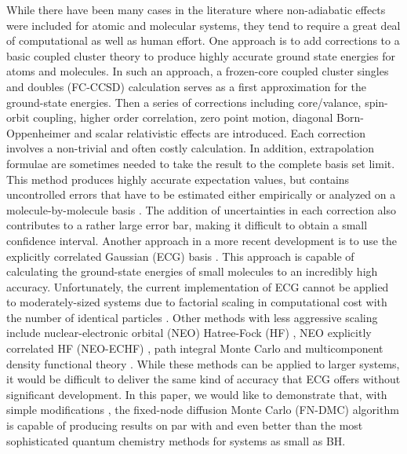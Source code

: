 \documentclass[aps,prl,superscriptaddress,groupedaddress]{revtex4}
\begin{document}
While there have been many cases in the literature where non-adiabatic effects were included for atomic and molecular systems, they tend to require a great deal of computational as well as human effort. One approach is to add corrections to a basic coupled cluster theory to produce highly accurate ground state energies for atoms and molecules\cite{Feller_Corrections}. In such an approach, a frozen-core coupled cluster singles and doubles (FC-CCSD) \cite{Purvis_CCSD} calculation serves as a first approximation for the ground-state energies. Then a series of corrections including core/valance, spin-orbit coupling, higher order correlation, zero point motion, diagonal Born-Oppenheimer and scalar relativistic effects are introduced. Each correction involves a non-trivial and often costly calculation. In addition, extrapolation formulae are sometimes needed to take the result to the complete basis set limit. This method produces highly accurate expectation values, but contains uncontrolled errors that have to be estimated either empirically or analyzed on a molecule-by-molecule basis \cite{Feller_Error}. The addition of uncertainties in each correction also contributes to a rather large error bar, making it difficult to obtain a small confidence interval. Another approach in a more recent development is to use the explicitly correlated Gaussian (ECG) basis \cite{Adamowicz_ECG,Mitroy_ECG}. This approach is capable of calculating the ground-state energies of small molecules to an incredibly high accuracy. Unfortunately, the current implementation of ECG cannot be applied to moderately-sized systems due to factorial scaling in computational cost with the number of identical particles \cite{Bubin_BH_noBO}. Other methods with less aggressive scaling include nuclear-electronic orbital (NEO) Hatree-Fock (HF) \cite{Sharon_NEO}, NEO explicitly correlated HF (NEO-ECHF) \cite{Sharon_NEOX,Sharon_NEOX1,Sharon_NEOX2}, path integral Monte Carlo \cite{Ilkka_Path,Ilkka_Path1,Ilkka_Path2} and multicomponent density functional theory \cite{Sharon_NEO-DFT,Sharon_NEO-DFT1,Sharon_NEO-DFT2,Sharon_NEO-DFT3,Gross_NEO-DFT,Gross_NEO-DFT1}. While these methods can be applied to larger systems, it would be difficult to deliver the same kind of accuracy that ECG offers without significant development. In this paper, we would like to demonstrate that, with simple modifications \cite{Tubman_ECG}, the fixed-node diffusion Monte Carlo (FN-DMC) algorithm is capable of producing results on par with and even better than the most sophisticated quantum chemistry methods for systems as small as BH.
\end{document}
